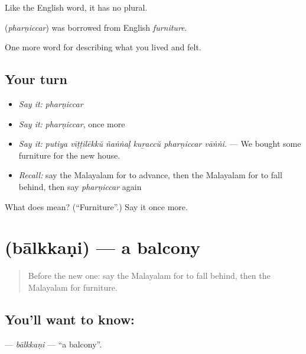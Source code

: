 Like the English word, it has no plural.

\begin{cousinweb}
\textbf{} (\emph{pharṇiccar}) was borrowed from English \emph{furniture}.
\end{cousinweb}

\begin{grammarlens}[title={What you've built}]
One more word for describing what you lived and felt.
\end{grammarlens}

\subsection*{Your turn}
\begin{itemize}
\raggedright
  \item \emph{Say it:} \emph{pharṇiccar}
  \item \emph{Say it:} \emph{pharṇiccar}, once more
  \item \emph{Say it:} \emph{putiya vīṭṭilēkkŭ ñaṅṅaḷ kuṟaccŭ pharṇiccar vāṅṅi.} — We bought some furniture for the new house.
  \item \emph{Recall:} say the Malayalam for to advance, then the Malayalam for to fall behind, then say \emph{pharṇiccar} again
\end{itemize}

\begin{tcolorbox}[breakable,colback=teal!4,colframe=teal!35!black,title={Before you move on}]
What does  mean? (\textquotedblleft{}Furniture\textquotedblright{}.) Say it once more.
\end{tcolorbox}
\section[\texorpdfstring{\ml{ബാൽക്കണി} (bālkkaṇi)}{ബാൽക്കണി (bālkkaṇi)}]{ (bālkkaṇi) — a balcony}

\label{lesson:ML-C570-balkkani}



\begin{quote}
Before the new one: say the Malayalam for to fall behind, then the Malayalam for furniture.
\end{quote}

\subsection*{You'll want to know: }
\textbf{} — \emph{bālkkaṇi} — \textquotedblleft{}a balcony\textquotedblright{}.

